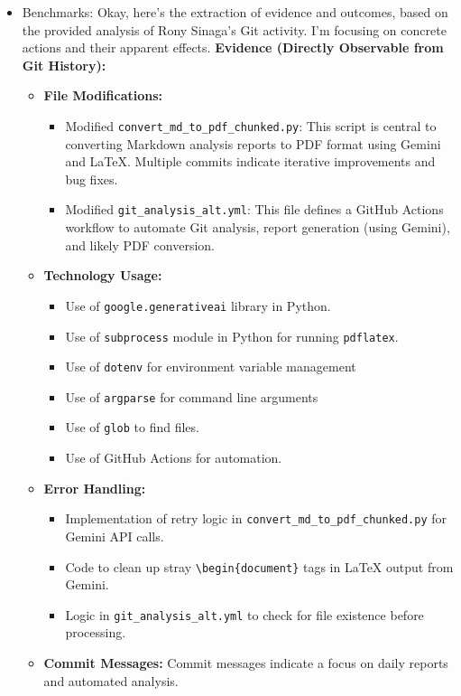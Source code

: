 \documentclass{article}
\begin{document}
\begin{itemize}
\begin{itemize}
        \item Benchmarks: Okay, here's the extraction of evidence and outcomes, based on the provided analysis of Rony Sinaga's Git activity.  I'm focusing on concrete actions and their apparent effects.
\textbf{Evidence (Directly Observable from Git History):}
\begin{itemize}
    \item \textbf{File Modifications:}
    \begin{itemize}
        \item Modified \texttt{convert\_md\_to\_pdf\_chunked.py}:  This script is central to converting Markdown analysis reports to PDF format using Gemini and LaTeX.  Multiple commits indicate iterative improvements and bug fixes.
        \item Modified \texttt{git\_analysis\_alt.yml}: This file defines a GitHub Actions workflow to automate Git analysis, report generation (using Gemini), and likely PDF conversion.
    \end{itemize}
    \item \textbf{Technology Usage:}
    \begin{itemize}
        \item Use of \texttt{google.generativeai} library in Python.
        \item Use of \texttt{subprocess} module in Python for running \texttt{pdflatex}.
        \item Use of \texttt{dotenv} for environment variable management
        \item Use of \texttt{argparse} for command line arguments
        \item Use of \texttt{glob} to find files.
        \item Use of GitHub Actions for automation.
    \end{itemize}
    \item \textbf{Error Handling:}
    \begin{itemize}
        \item Implementation of retry logic in \texttt{convert\_md\_to\_pdf\_chunked.py} for Gemini API calls.
        \item Code to clean up stray \texttt{\textbackslash begin\{document\}} tags in LaTeX output from Gemini.
        \item Logic in \texttt{git\_analysis\_alt.yml} to check for file existence before processing.
    \end{itemize}
    \item \textbf{Commit Messages:} Commit messages indicate a focus on daily reports and automated analysis.

\end{itemize}
\end{itemize}
\end{itemize}
\end{document}
